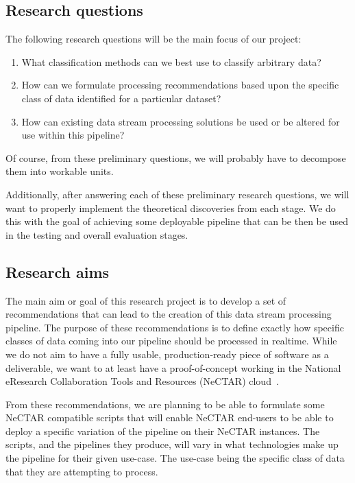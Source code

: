\documentclass[a4paper,11pt]{article}
\begin{document}
\subsection{Research questions} %
\label{sub:research_questions}

The following research questions will be the main focus of our project:

\begin{enumerate}
  \item What classification methods can we best use to classify arbitrary data?
  \item How can we formulate processing recommendations based upon the specific class of data identified for a particular dataset?
  \item How can existing data stream processing solutions be used or be altered for use within this pipeline?
\end{enumerate}

Of course, from these preliminary questions, we will probably have to decompose them into workable units.

Additionally, after answering each of these preliminary research questions, we will want to properly implement the theoretical discoveries from each stage. We do this with the goal of achieving some deployable pipeline that can be then be used in the testing and overall evaluation stages.



\subsection{Research aims} %
\label{sub:research_aims}

The main aim or goal of this research project is to develop a set of recommendations that can lead to the creation of
this data stream processing pipeline. The purpose of these recommendations is to define exactly how specific classes of data coming into our pipeline should be processed in realtime. While we do not aim to have a fully usable, production-ready piece of software as a
deliverable, we want to at least have a proof-of-concept working in the National eResearch Collaboration Tools and Resources
(NeCTAR) cloud~\cite{web:Nectar}.

From these recommendations, we are planning to be able to formulate some NeCTAR compatible scripts that will enable NeCTAR end-users to be able to deploy a specific variation of the pipeline on their NeCTAR instances. The scripts, and the pipelines they produce, will vary in what technologies make up the pipeline for their given use-case. The use-case being the specific class of data that they are attempting to process.
\end{document}
